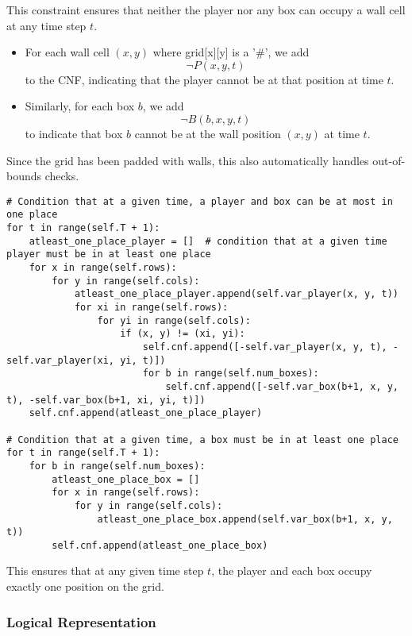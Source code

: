 \documentclass[12pt,a4paper]{article}
\begin{document}
This constraint ensures that neither the player nor any box can occupy a wall cell at any time step \(t\).  

\begin{itemize}
    \item For each wall cell \((x,y)\) where grid[x][y] is a '\#', we add 
    \[
    \neg P(x,y,t)
    \] 
    to the CNF, indicating that the player cannot be at that position at time \(t\).  

    \item Similarly, for each box \(b\), we add 
    \[
    \neg B(b,x,y,t)
    \] 
    to indicate that box \(b\) cannot be at the wall position \((x,y)\) at time \(t\).  
\end{itemize}

Since the grid has been padded with walls, this also automatically handles out-of-bounds checks.
\newpage


\begin{lstlisting}
# Condition that at a given time, a player and box can be at most in one place
for t in range(self.T + 1):
    atleast_one_place_player = []  # condition that at a given time player must be in at least one place
    for x in range(self.rows):
        for y in range(self.cols):
            atleast_one_place_player.append(self.var_player(x, y, t))
            for xi in range(self.rows):
                for yi in range(self.cols):
                    if (x, y) != (xi, yi):
                        self.cnf.append([-self.var_player(x, y, t), -self.var_player(xi, yi, t)])
                        for b in range(self.num_boxes):
                            self.cnf.append([-self.var_box(b+1, x, y, t), -self.var_box(b+1, xi, yi, t)])
    self.cnf.append(atleast_one_place_player)

# Condition that at a given time, a box must be in at least one place
for t in range(self.T + 1):
    for b in range(self.num_boxes):
        atleast_one_place_box = []
        for x in range(self.rows):
            for y in range(self.cols):
                atleast_one_place_box.append(self.var_box(b+1, x, y, t))
        self.cnf.append(atleast_one_place_box)
\end{lstlisting}

This ensures that at any given time step \(t\), the player and each box occupy exactly one position on the grid.

\subsubsection*{Logical Representation}
\end{document}
